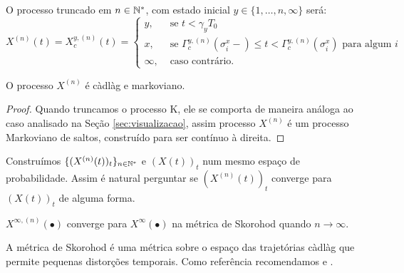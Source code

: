 O processo truncado em $n \in {\mathbb{N^*}}$, com estado inicial $y \in \{1,
\ldots, n, \infty\}$ será:
\begin{displaymath}
  X^{(n)}(t) = X^{y,(n)}_c(t) = \begin{cases}
    y, & \textrm{ se }  t < \gamma_y T_0 \\
    x, & \textrm{ se } \Gamma^{y,(n)}_c(\sigma_i^x-) \leq t <
    \Gamma^{y,(n)}_c(\sigma^x_i)
    \text{ para algum } i \\
    \infty, & \textrm{ caso contrário.}
  \end{cases}
\end{displaymath}

\begin{proposicao}
  O processo $X^{(n)}$ é càdlàg e markoviano.
\end{proposicao}
\begin{proof}
  Quando truncamos o processo K, ele se comporta de maneira análoga ao
  caso analisado na Seção \ref{sec:visualizacao}, assim processo
  $X^{(n)}$ é um processo Markoviano de saltos, construído para ser
  contínuo à direita.
\end{proof}

Construímos $\{(X^{(n)}(t))_t\}_{n \in {\mathbb{N^*}}}$ e $(X(t))_t$ num mesmo
espaço de probabilidade. Assim é natural perguntar se $(X^{(n)}(t))_t$
converge para $(X(t))_t$ de alguma forma.

\begin{teorema}
  \label{teo:convergencia}
  $X^{\infty, (n)} (\bullet)$ converge para $X^\infty(\bullet)$ \qc na
  métrica de Skorohod quando $n \to \infty$.
\end{teorema}

A métrica de Skorohod é uma métrica sobre o espaço das trajetórias
càdlàg que permite pequenas distorções temporais. Como
referência recomendamos \cite{billingsley:99} e \cite{ethier:86}.

